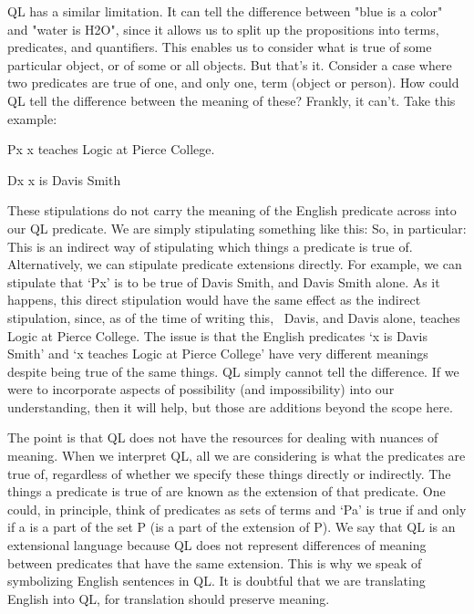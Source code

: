 QL has a similar limitation. It can tell the difference between "blue is a color" and "water is H2O", since it allows us to split up the propositions into terms, predicates, and quantifiers. This enables us to consider what is true of some particular object, or of some or all objects. But that’s it. Consider a case where two predicates are true of one, and only one, term (object or person). How could QL tell the difference between the meaning of these? Frankly, it can't. Take this example:
\begin{ekey}
\item[Px] x teaches Logic at Pierce College.
\item[Dx] x is Davis Smith
\end{ekey}
These stipulations do not carry the meaning of the English predicate across into our QL predicate. We are simply stipulating something like this:
So, in particular:
This is an indirect way of stipulating which things a predicate is true of. Alternatively, we can stipulate predicate extensions directly. For example, we can stipulate that ‘Px’ is to be true of Davis Smith, and Davis Smith alone. As it happens, this direct stipulation would have the same effect as the indirect stipulation, since, as of the time of writing this,  Davis, and Davis alone, teaches Logic at Pierce College. The issue is that the English predicates ‘x is Davis Smith’ and ‘x teaches Logic at Pierce College’ have very different meanings despite being true of the same things. QL simply cannot tell the difference. If we were to incorporate aspects of possibility (and impossibility) into our understanding, then it will help, but those are additions beyond the scope here.

The point is that QL does not have the resources for dealing with nuances of meaning. When we interpret QL, all we are considering is what the predicates are true of, regardless of whether we specify these things directly or indirectly. The things a predicate is true of are known as the extension of that predicate. One could, in principle, think of predicates as sets of terms and ‘Pa' is true if and only if a is a part of the set P (is a part of the extension of P). We say that QL is an extensional language because QL does not represent differences of meaning between predicates that have the same extension. This is why we speak of symbolizing English sentences in QL. It is doubtful that we are translating English into QL, for translation should preserve meaning.
